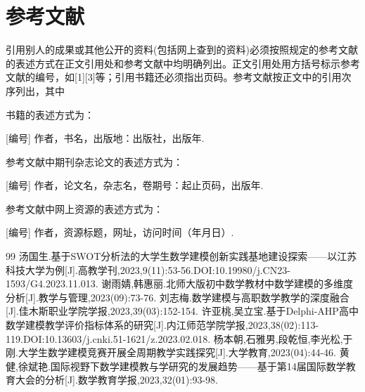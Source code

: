 \section{参考文献}
引用别人的成果或其他公开的资料(包括网上查到的资料)必须按照规定的参考文献的表述方式在正文引用处和参考文献中均明确列出。正文引用处用方括号标示参考文献的编号，如[1][3]等；引用书籍还必须指出页码。参考文献按正文中的引用次序列出，其中

书籍的表述方式为：

[编号] 作者，书名，出版地：出版社，出版年.

参考文献中期刊杂志论文的表述方式为：

[编号] 作者，论文名，杂志名，卷期号：起止页码，出版年.

参考文献中网上资源的表述方式为：

[编号] 作者，资源标题，网址，访问时间（年月日）.
\begin{thebibliography}{99}
\bibitem{} 汤国生.基于SWOT分析法的大学生数学建模创新实践基地建设探索——以江苏科技大学为例[J].高教学刊,2023,9(11):53-56.DOI:10.19980/j.CN23-1593/G4.2023.11.013.
\bibitem{} 谢雨婧,韩惠丽.北师大版初中数学教材中数学建模的多维度分析[J].教学与管理,2023(09):73-76.
\bibitem{} 刘志梅.数学建模与高职数学教学的深度融合[J].佳木斯职业学院学报,2023,39(03):152-154.
\bibitem{} 许亚桃,吴立宝.基于Delphi-AHP高中数学建模教学评价指标体系的研究[J].内江师范学院学报,2023,38(02):113-119.DOI:10.13603/j.cnki.51-1621/z.2023.02.018.
\bibitem{} 杨本朝,石雅男,段乾恒,李光松,于刚.大学生数学建模竞赛开展全周期教学实践探究[J].大学教育,2023(04):44-46.
\bibitem{} 黄健,徐斌艳.国际视野下数学建模教与学研究的发展趋势——基于第14届国际数学教育大会的分析[J].数学教育学报,2023,32(01):93-98.
\end{thebibliography}